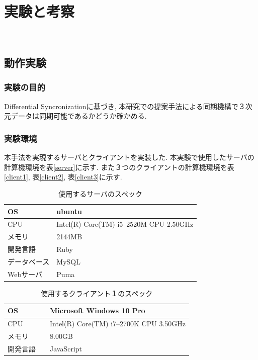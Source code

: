\chapter{実験と考察}　\label{chap:test}
\section{動作実験}
\subsection{実験の目的}
Differential Syncronizationに基づき, 本研究での提案手法による同期機構で３次元データは同期可能であるかどうか確かめる.
\subsection{実験環境}
本手法を実現するサーバとクライアントを実装した. 本実験で使用したサーバの計算機環境を表\ref{server}に示す. また３つのクライアントの計算機環境を表\ref{client1}, 表\ref{client2}, 表\ref{client3}に示す.
\begin{table}[htbp]
\begin{center}
	\caption{使用するサーバのスペック}
	\begin{tabular}{|l|l|} \hline
		OS & ubuntu \\ \hline
		CPU &  Intel(R) Core(TM) i5--2520M CPU 2.50GHz\\ \hline
		メモリ & 2144MB \\ \hline
    開発言語　& Ruby \\ \hline
		データベース & MySQL \\ \hline
		Webサーバ & Puma\\ \hline
	\end{tabular}
	\label{1_server}
\end{center}
\end{table}

\begin{table}[htbp]
\begin{center}
	\caption{使用するクライアント１のスペック}
	\begin{tabular}{|l|l|} \hline
		OS & Microsoft Windows 10 Pro \\ \hline
		CPU & Intel(R) Core(TM) i7--2700K CPU 3.50GHz \\ \hline
		メモリ & 8.00GB \\ \hline
    開発言語　& JavaScript \\ \hline
	\end{tabular}
	\label{1_client1}
\end{center}
\end{table}

